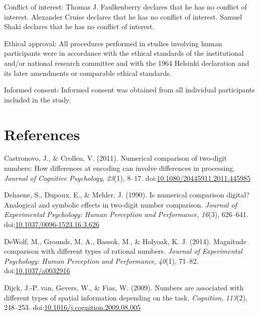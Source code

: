 \documentclass[english,man]{apa6}
\theoremstyle{definition}
\theoremstyle{definition}
\theoremstyle{definition}
\theoremstyle{remark}
\begin{document}
Conflict of interest: Thomas J. Faulkenberry declares that he has no
conflict of interest. Alexander Cruise declares that he has no conflict
of interest. Samuel Shaki declares that he has no conflict of interest.

Ethical approval: All procedures performed in studies involving human
participants were in accordance with the ethical standards of the
institutional and/or national research committee and with the 1964
Helsinki declaration and its later amendments or comparable ethical
standards.

Informed consent: Informed consent was obtained from all individual
participants included in the study.

\newpage

\section{References}\label{references}

\setlength{\parindent}{-0.5in} \setlength{\leftskip}{0.5in}

\hypertarget{refs}{}
\hypertarget{ref-castronovo2011}{}
Castronovo, J., \& Crollen, V. (2011). Numerical comparison of two-digit
numbers: How differences at encoding can involve differences in
processing. \emph{Journal of Cognitive Psychology}, \emph{23}(1), 8--17.
doi:\href{https://doi.org/10.1080/20445911.2011.445985}{10.1080/20445911.2011.445985}

\hypertarget{ref-dehaene1990}{}
Dehaene, S., Dupoux, E., \& Mehler, J. (1990). Is numerical comparison
digital? Analogical and symbolic effects in two-digit number comparison.
\emph{Journal of Experimental Psychology: Human Perception and
Performance}, \emph{16}(3), 626--641.
doi:\href{https://doi.org/10.1037/0096-1523.16.3.626}{10.1037/0096-1523.16.3.626}

\hypertarget{ref-dewolf2014}{}
DeWolf, M., Grounds, M. A., Bassok, M., \& Holyoak, K. J. (2014).
Magnitude comparison with different types of rational numbers.
\emph{Journal of Experimental Psychology: Human Perception and
Performance}, \emph{40}(1), 71--82.
doi:\href{https://doi.org/10.1037/a0032916}{10.1037/a0032916}

\hypertarget{ref-vanDijck2009}{}
Dijck, J.-P. van, Gevers, W., \& Fias, W. (2009). Numbers are associated
with different types of spatial information depending on the task.
\emph{Cognition}, \emph{113}(2), 248--253.
doi:\href{https://doi.org/10.1016/j.cognition.2009.08.005}{10.1016/j.cognition.2009.08.005}
\end{document}

